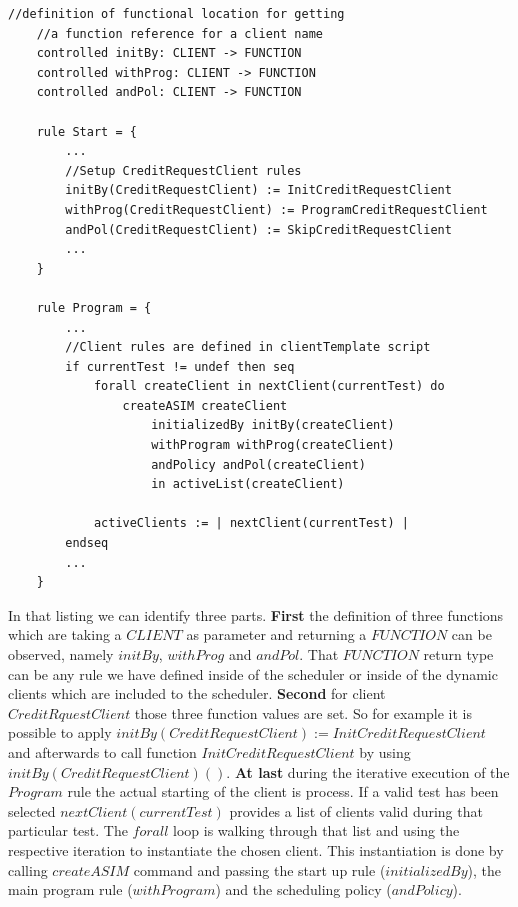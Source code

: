 \begin{center}
\begin{minipage}{0.8\textwidth}
\small
\begin{lstlisting}[language=bsl_lst,caption={\bf\small Scheduler core functionality},label={lst:impl-sched-core} ]
	//definition of functional location for getting
	//a function reference for a client name
	controlled initBy: CLIENT -> FUNCTION
	controlled withProg: CLIENT -> FUNCTION
	controlled andPol: CLIENT -> FUNCTION
	
	rule Start = {
		...
		//Setup CreditRequestClient rules
		initBy(CreditRequestClient) := InitCreditRequestClient
		withProg(CreditRequestClient) := ProgramCreditRequestClient
		andPol(CreditRequestClient) := SkipCreditRequestClient
		...
	}
	
	rule Program = {
		...
		//Client rules are defined in clientTemplate script
		if currentTest != undef then seq			
			forall createClient in nextClient(currentTest) do
				createASIM createClient
					initializedBy initBy(createClient)
					withProgram withProg(createClient)
					andPolicy andPol(createClient)
					in activeList(createClient)
					
			activeClients := | nextClient(currentTest) |
		endseq
		...
	}
\end{lstlisting}
\end{minipage}
\end{center}

In that listing we can identify three parts. \textbf{First} the definition of three functions which are taking a $CLIENT$ as parameter and returning a $FUNCTION$ can be observed, namely $initBy$, $withProg$ and $andPol$. That $FUNCTION$ return type can be any rule we have defined inside of the scheduler or inside of the dynamic clients which are included to the scheduler. \textbf{Second} for client $CreditRquestClient$ those three function values are set. So for example it is possible to apply $initBy(CreditRequestClient) := InitCreditRequestClient$ and afterwards to call function $InitCreditRequestClient$ by using  $initBy(CreditRequestClient)()$. \textbf{At last} during the iterative execution of the $Program$ rule the actual starting of the client is process. If a valid test has been selected $nextClient(currentTest)$ provides a list of clients valid during that particular test. The $forall$ loop is walking through that list and using the respective iteration to instantiate the chosen client. This instantiation is done by calling $createASIM$ command and passing the start up rule ($initializedBy$), the main program rule ($withProgram$) and the scheduling policy ($andPolicy$).

